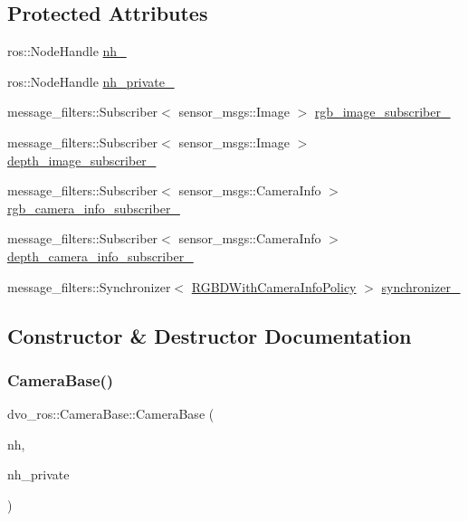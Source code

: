 \subsection*{Protected Attributes}
\begin{DoxyCompactItemize}
\item 
ros\+::\+Node\+Handle \mbox{\hyperlink{classdvo__ros_1_1_camera_base_a38fe2cd9f4b4aa6ca843ea317ddf8bad}{nh\+\_\+}}
\item 
ros\+::\+Node\+Handle \mbox{\hyperlink{classdvo__ros_1_1_camera_base_ad8c455ad2a0d51f0cea6072621058b77}{nh\+\_\+private\+\_\+}}
\item 
message\+\_\+filters\+::\+Subscriber$<$ sensor\+\_\+msgs\+::\+Image $>$ \mbox{\hyperlink{classdvo__ros_1_1_camera_base_a38d299b1c046830ef1552a0e4a31d7b2}{rgb\+\_\+image\+\_\+subscriber\+\_\+}}
\item 
message\+\_\+filters\+::\+Subscriber$<$ sensor\+\_\+msgs\+::\+Image $>$ \mbox{\hyperlink{classdvo__ros_1_1_camera_base_a9d2f9d7b4ef5d948d09610d7a518984b}{depth\+\_\+image\+\_\+subscriber\+\_\+}}
\item 
message\+\_\+filters\+::\+Subscriber$<$ sensor\+\_\+msgs\+::\+Camera\+Info $>$ \mbox{\hyperlink{classdvo__ros_1_1_camera_base_a3009d23f7083e4d2aa0c9b52068f96ca}{rgb\+\_\+camera\+\_\+info\+\_\+subscriber\+\_\+}}
\item 
message\+\_\+filters\+::\+Subscriber$<$ sensor\+\_\+msgs\+::\+Camera\+Info $>$ \mbox{\hyperlink{classdvo__ros_1_1_camera_base_aec2df412779aa6ef9643a54a5910424a}{depth\+\_\+camera\+\_\+info\+\_\+subscriber\+\_\+}}
\item 
message\+\_\+filters\+::\+Synchronizer$<$ \mbox{\hyperlink{namespacedvo__ros_ae8c4d74734d4ef3107bf429ef461e553}{R\+G\+B\+D\+With\+Camera\+Info\+Policy}} $>$ \mbox{\hyperlink{classdvo__ros_1_1_camera_base_aac780a822e3a2b6779a2a9598b0b52d2}{synchronizer\+\_\+}}
\end{DoxyCompactItemize}


\subsection{Constructor \& Destructor Documentation}
\mbox{\label{classdvo__ros_1_1_camera_base_af3d3ae6aaad83055c752c114b2100104}} 
\subsubsection{\texorpdfstring{Camera\+Base()}{CameraBase()}}
{\footnotesize\ttfamily dvo\+\_\+ros\+::\+Camera\+Base\+::\+Camera\+Base (\begin{DoxyParamCaption}\item[{ros\+::\+Node\+Handle \&}]{nh,  }\item[{ros\+::\+Node\+Handle \&}]{nh\+\_\+private }\end{DoxyParamCaption})}

